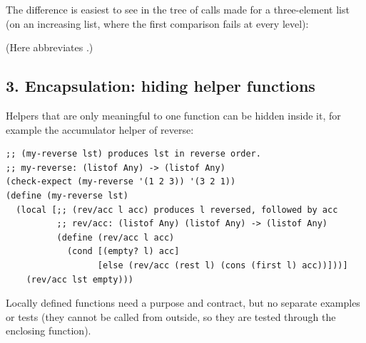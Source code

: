 The difference is easiest to see in the tree of calls made for a
three-element list (on an increasing list, where the first comparison fails at every level):

\begin{center}
\end{center}
(Here  abbreviates .)

\subsection{3. Encapsulation: hiding helper functions}
Helpers that are only meaningful to one function can be hidden inside it,
for example the accumulator helper of reverse:
\begin{lstlisting}[style=racket]
;; (my-reverse lst) produces lst in reverse order.
;; my-reverse: (listof Any) -> (listof Any)
(check-expect (my-reverse '(1 2 3)) '(3 2 1))
(define (my-reverse lst)
  (local [;; (rev/acc l acc) produces l reversed, followed by acc
          ;; rev/acc: (listof Any) (listof Any) -> (listof Any)
          (define (rev/acc l acc)
            (cond [(empty? l) acc]
                  [else (rev/acc (rest l) (cons (first l) acc))]))]
    (rev/acc lst empty)))
\end{lstlisting}
Locally defined functions need a purpose and contract, but no separate
examples or tests (they cannot be called from outside, so they are tested
through the enclosing function).

